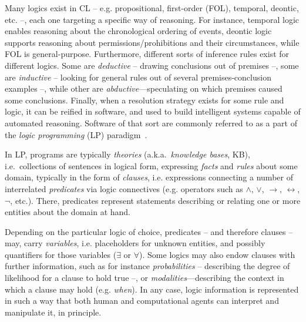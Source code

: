 \documentclass[12pt,a4paper,openright,twoside]{book}
\begin{document}
Many logics exist in CL -- e.g. propositional, first-order (FOL), temporal, deontic, etc. --, each one targeting a specific way of reasoning.
%
For instance, temporal logic enables reasoning about the chronological ordering of events, deontic logic supports reasoning about permissions/prohibitions and their circumstances, while FOL is general-purpose.
%
Furthermore, different sorts of inference rules exist for different logics.
%
Some are \emph{deductive} -- drawing conclusions out of premises --, some are \emph{inductive} -- looking for general rules out of several premises-conclusion examples --, while other are \emph{abductive}---speculating on which premises caused some conclusions.
%
Finally, when a resolution strategy exists for some rule and logic, it can be reified in software, and used to build intelligent systems capable of automated reasoning.
%
Software of that sort are commonly referred to as a part of the \emph{logic programming} (LP) paradigm~\cite{Nerode1996}.

In LP, programs are typically \emph{theories} (a.k.a.\ \emph{knowledge bases}, KB), i.e.\ collections of sentences in logical form, expressing \emph{facts} and \emph{rules} about some domain, typically in the form of \emph{clauses}, i.e. expressions connecting a number of interrelated \emph{predicates} via logic connectives (e.g. operators such as $\wedge$, $\vee$, $\rightarrow$, $\leftrightarrow$, $\lnot$, etc.).
%
There, predicates represent statements describing or relating one or more entities about the domain at hand.

Depending on the particular logic of choice, predicates -- and therefore clauses -- may, carry \emph{variables}, i.e. placeholders for unknown entities, and possibly quantifiers for those variables ($\exists$ or $\forall$).
%
Some logics may also endow clauses with further information, such as for instance \emph{probabilities} -- describing the degree of likelihood for a clause to hold true --, or \emph{modalities}---describing the context in which a clause may hold (e.g. \emph{when}).
%
In any case, logic information is represented in such a way that both human and computational agents can interpret and manipulate it, in principle.
\end{document}
